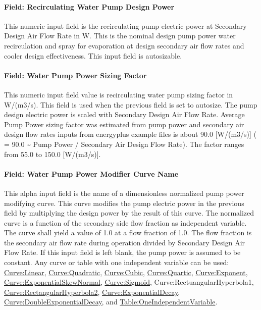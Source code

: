 \paragraph{Field: Recirculating Water Pump Design Power}\label{field-recirculating-water-pump-design-power}

This numeric input field is the recirculating pump electric power at Secondary Design Air Flow Rate in W. This is the nominal design pump power water recirculation and spray for evaporation at design secondary air flow rates and cooler design effectiveness. This input field is autosizable.

\paragraph{Field: Water Pump Power Sizing Factor}\label{field-water-pump-power-sizing-factor-1}

This numeric input field value is recirculating water pump sizing factor in W/(m3/s). This field is used when the previous field is set to autosize. The pump design electric power is scaled with Secondary Design Air Flow Rate. Average Pump Power sizing factor was estimated from pump power and secondary air design flow rates inputs from energyplus example files is about 90.0 {[}W/(m3/s){]} ( = 90.0 \textasciitilde{} Pump Power / Secondary Air Design Flow Rate). The factor ranges from 55.0 to 150.0 {[}W/(m3/s){]}.

\paragraph{Field: Water Pump Power Modifier Curve Name}\label{field-water-pump-power-modifier-curve-name-1}

This alpha input field is the name of a dimensionless normalized pump power modifying curve. This curve modifies the pump electric power in the previous field by multiplying the design power by the result of this curve. The normalized curve is a function of the secondary side flow fraction as independent variable. The curve shall yield a value of 1.0 at a flow fraction of 1.0. The flow fraction is the secondary air flow rate during operation divided by Secondary Design Air Flow Rate. If this input field is left blank, the pump power is assumed to be constant. Any curve or table with one independent variable can be used: \hyperref[curvelinear]{Curve:Linear}, \hyperref[curvequadratic]{Curve:Quadratic}, \hyperref[curvecubic]{Curve:Cubic}, \hyperref[curvequartic]{Curve:Quartic}, \hyperref[curveexponent]{Curve:Exponent}, \hyperref[curveexponentialskewnormal]{\hyperref[curveexponent]{Curve:Exponent}ialSkewNormal}, \hyperref[curvesigmoid]{Curve:Sigmoid}, Curve:RectuangularHyperbola1, \hyperref[curverectangularhyperbola2]{Curve:RectangularHyperbola2}, \hyperref[curveexponentialdecay]{\hyperref[curveexponent]{Curve:Exponent}ialDecay}, \hyperref[curvedoubleexponentialdecay]{Curve:DoubleExponentialDecay}, and \hyperref[tableoneindependentvariable]{Table:OneIndependentVariable}.

